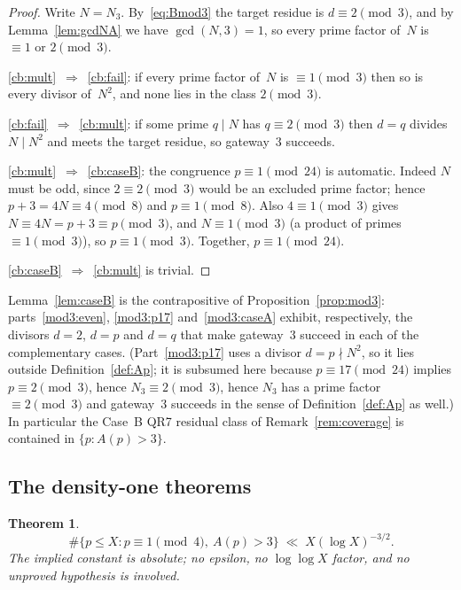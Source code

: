 \documentclass[12pt]{amsart}
\newtheorem{theorem}{Theorem}[section]
\theoremstyle{definition}
\theoremstyle{remark}
\begin{document}
\begin{proof}
Write $N = N_3$.  By~\eqref{eq:Bmod3} the target residue is
$d \equiv 2 \pmod 3$, and by Lemma~\ref{lem:gcdNA} we have
$\gcd(N, 3) = 1$, so every prime factor of~$N$ is $\equiv 1$ or
$2 \pmod 3$.

\ref{cb:mult}~$\Rightarrow$~\ref{cb:fail}: if every prime factor of~$N$
is $\equiv 1 \pmod 3$ then so is every divisor of~$N^2$, and none lies
in the class $2 \pmod 3$.

\ref{cb:fail}~$\Rightarrow$~\ref{cb:mult}: if some prime $q \mid N$ has
$q \equiv 2 \pmod 3$ then $d = q$ divides $N \mid N^2$ and meets the
target residue, so gateway~$3$ succeeds.

\ref{cb:mult}~$\Rightarrow$~\ref{cb:caseB}: the congruence
$p \equiv 1 \pmod{24}$ is automatic.  Indeed $N$ must be odd, since
$2 \equiv 2 \pmod 3$ would be an excluded prime factor; hence
$p + 3 = 4N \equiv 4 \pmod 8$ and $p \equiv 1 \pmod 8$.  Also
$4 \equiv 1 \pmod 3$ gives $N \equiv 4N = p+3 \equiv p \pmod 3$, and
$N \equiv 1 \pmod 3$ (a product of primes $\equiv 1 \pmod 3$), so
$p \equiv 1 \pmod 3$.  Together, $p \equiv 1 \pmod{24}$.

\ref{cb:caseB}~$\Rightarrow$~\ref{cb:mult} is trivial.
\end{proof}

Lemma~\ref{lem:caseB} is the contrapositive of
Proposition~\ref{prop:mod3}: parts~\ref{mod3:even}, \ref{mod3:p17}
and~\ref{mod3:caseA} exhibit, respectively, the divisors $d = 2$,
$d = p$ and $d = q$ that make gateway~$3$ succeed in each of the
complementary cases.  (Part~\ref{mod3:p17} uses a divisor
$d = p \nmid N^2$, so it lies outside Definition~\ref{def:Ap}; it is
subsumed here because $p \equiv 17 \pmod{24}$ implies
$p \equiv 2 \pmod 3$, hence $N_3 \equiv 2 \pmod 3$, hence $N_3$ has a
prime factor $\equiv 2 \pmod 3$ and gateway~$3$ succeeds in the sense of
Definition~\ref{def:Ap} as well.)
In particular the Case~B QR7 residual class of
Remark~\ref{rem:coverage} is contained in $\{p : A(p) > 3\}$.

\subsection{The density-one theorems}

\begin{theorem}\label{thm:densityone}
\[
  \#\{p \leq X : p \equiv 1 \!\!\pmod 4,\ A(p) > 3\}
  \;\ll\; X (\log X)^{-3/2}.
\]
The implied constant is absolute; no epsilon, no $\log\log X$ factor,
and no unproved hypothesis is involved.
\end{theorem}
\end{document}
